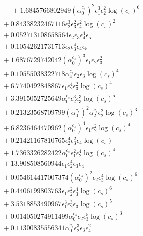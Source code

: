 \documentclass[10pt]{article}
\begin{document}
\begin{align*}
\phantom{F_{s,7}} &\phantom{={}}{}  + 1.6845766802949 \left(\alpha_{0}^{c_s}\right)^{2} \epsilon_{1}^{3} \epsilon_{2}^{2} \log{\left(c_{s} \right)}^{6} \\
&{}  + 0.84338232467116 \epsilon_{2}^{3} \epsilon_{3}^{2} \epsilon_{4}^{2} \log{\left(c_{s} \right)}^{2} \\
&{}  + 0.052713108658564 \epsilon_{2} \epsilon_{3} \epsilon_{4}^{4} \epsilon_{5} \\
&{}  + 0.10542621731713 \epsilon_{2} \epsilon_{3}^{4} \epsilon_{4} \epsilon_{5} \\
&{}  + 1.6876729742042 \left(\alpha_{0}^{c_s}\right)^{3} \epsilon_{1} \epsilon_{2} \epsilon_{3}^{2} \\
&{}  + 0.10555038322718 \alpha_{4}^{c_s} \epsilon_{2} \epsilon_{3} \log{\left(c_{s} \right)}^{4} \\
&{}  + 6.7740492848867 \epsilon_{1} \epsilon_{2}^{4} \epsilon_{3}^{2} \log{\left(c_{s} \right)}^{4} \\
&{}  + 3.3915052725649 \alpha_{0}^{c_s} \epsilon_{2}^{3} \epsilon_{3}^{3} \log{\left(c_{s} \right)}^{5} \\
&{}  + 0.21323568709799 \left(\alpha_{0}^{c_s}\right)^{2} \alpha_{2}^{c_s} \epsilon_{2}^{2} \log{\left(c_{s} \right)}^{3} \\
&{}  + 6.8236464470962 \left(\alpha_{0}^{c_s}\right)^{4} \epsilon_{1} \epsilon_{2}^{2} \log{\left(c_{s} \right)}^{4} \\
&{}  + 0.21421167810765 \epsilon_{2}^{4} \epsilon_{3}^{2} \epsilon_{4} \log{\left(c_{s} \right)} \\
&{}  + 1.7363326282422 \alpha_{0}^{c_s} \epsilon_{1}^{2} \epsilon_{2}^{4} \log{\left(c_{s} \right)}^{4} \\
&{}  + 13.908508560944 \epsilon_{1} \epsilon_{2}^{4} \epsilon_{3} \epsilon_{4} \\
&{}  + 0.054614417007374 \left(\alpha_{0}^{c_s}\right)^{2} \epsilon_{2} \epsilon_{3}^{4} \log{\left(c_{s} \right)}^{6} \\
&{}  + 0.4406199803763 \epsilon_{1} \epsilon_{2}^{2} \epsilon_{3}^{4} \log{\left(c_{s} \right)}^{6} \\
&{}  + 3.5318853490967 \epsilon_{1}^{3} \epsilon_{2}^{3} \epsilon_{3} \log{\left(c_{s} \right)}^{5} \\
&{}  + 0.014050274911499 \alpha_{0}^{c_s} \epsilon_{2} \epsilon_{3}^{5} \log{\left(c_{s} \right)}^{3} \\
&{}  + 0.11300835556341 \alpha_{0}^{c_s} \epsilon_{2}^{3} \epsilon_{3} \epsilon_{4}^{2} \\

\end{align*}
\end{document}
